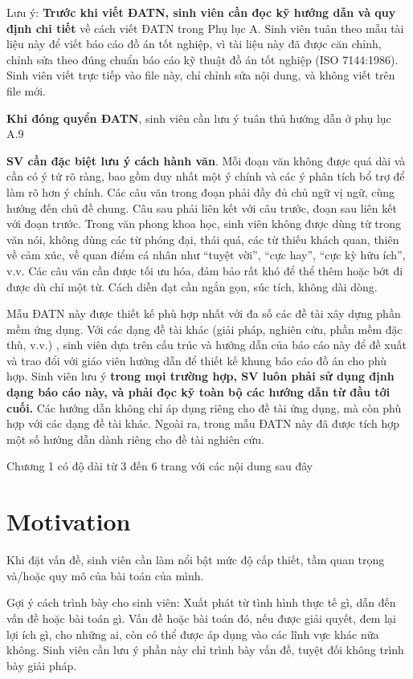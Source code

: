 \documentclass[../Main.tex]{subfiles}
\begin{document}
Lưu ý: \textbf{Trước khi viết ĐATN, sinh viên cần đọc kỹ hướng dẫn và quy định chi tiết} về cách viết ĐATN trong Phụ lục A.
Sinh viên tuân theo mẫu tài liệu này để viết báo cáo đồ án tốt nghiệp, vì tài liệu này đã được căn chỉnh, chỉnh sửa theo đúng chuẩn báo cáo kỹ thuật đồ án tốt nghiệp (ISO 7144:1986).
Sinh viên viết trực tiếp vào file này, chỉ chỉnh sửa nội dung, và không viết trên file mới.

\textbf{Khi đóng quyển ĐATN}, sinh viên cần lưu ý tuân thủ hướng dẫn ở phụ lục A.9

\textbf{SV cần đặc biệt lưu ý cách hành văn}.
Mỗi đoạn văn không được quá dài và cần có ý tứ rõ ràng, bao gồm duy nhất một ý chính và các ý phân tích bổ trợ để làm rõ hơn ý chính.
Các câu văn trong đoạn phải đầy đủ chủ ngữ vị ngữ, cùng hướng đến chủ đề chung.
Câu sau phải liên kết với câu trước, đoạn sau liên kết với đoạn trước.
Trong văn phong khoa học, sinh viên không được dùng từ trong văn nói, không dùng các từ phóng đại, thái quá, các từ thiếu khách quan, thiên về cảm xúc, về quan điểm cá nhân như “tuyệt vời”, “cực hay”, “cực kỳ hữu ích”, v.v.
Các câu văn cần được tối ưu hóa, đảm bảo rất khó để thể thêm hoặc bớt đi được dù chỉ một từ.
Cách diễn đạt cần ngắn gọn, súc tích, không dài dòng.

Mẫu ĐATN này được thiết kế phù hợp nhất với đa số các đề tài xây dựng phần mềm ứng dụng.
Với các dạng đề tài khác (giải pháp, nghiên cứu, phần mềm đặc thù, v.v.)
, sinh viên dựa trên cấu trúc và hướng dẫn của báo cáo này để đề xuất và trao đổi với giáo viên hướng dẫn để thiết kế khung báo cáo đồ án cho phù hợp.
Sinh viên lưu ý \textbf{trong mọi trường hợp, SV luôn phải sử dụng định dạng báo cáo này, và phải đọc kỹ toàn bộ các hướng dẫn từ đầu tới cuối.
}
Các hướng dẫn không chỉ áp dụng riêng cho đề tài ứng dụng, mà còn phù hợp với các dạng đề tài khác.
Ngoài ra, trong mẫu ĐATN này đã được tích hợp một số hướng dẫn dành riêng cho đề tài nghiên cứu.

Chương 1 có độ dài từ 3 đến 6 trang với các nội dung sau đây

\section{Motivation}
\label{section:1.1}
Khi đặt vấn đề, sinh viên cần làm nổi bật mức độ cấp thiết, tầm quan trọng và/hoặc quy mô của bài toán của mình.

Gợi ý cách trình bày cho sinh viên: Xuất phát từ tình hình thực tế gì, dẫn đến vấn đề hoặc bài toán gì.
Vấn đề hoặc bài toán đó, nếu được giải quyết, đem lại lợi ích gì, cho những ai, còn có thể được áp dụng vào các lĩnh vực khác nữa không.
Sinh viên cần lưu ý phần này chỉ trình bày vấn đề, tuyệt đối không trình bày giải pháp.
\end{document}
